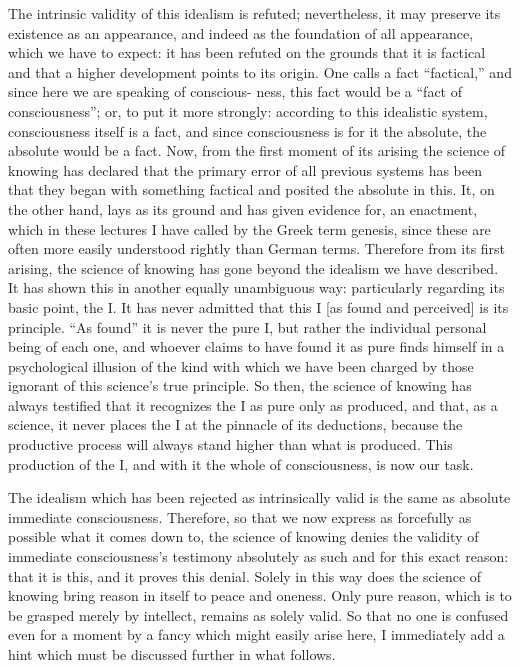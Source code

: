 The intrinsic validity of this idealism is refuted;
nevertheless, it may preserve its existence as an appearance,
and indeed as the foundation of all appearance,
which we have to expect:
it has been refuted on the grounds that it is factical
and that a higher development points to its origin.
One calls a fact
“factical,” and since here we are speaking of conscious-
ness, this fact would be a “fact of consciousness”;
or, to put it more strongly:
according to this idealistic system,
consciousness itself is a fact,
and since consciousness is for it the absolute,
the absolute would be a fact.
Now, from the first moment of its arising
the science of knowing has declared that the
primary error of all previous systems has been
that they began with something factical
and posited the absolute in this.
It, on the other hand, lays as its ground
and has given evidence for, an enactment,
which in these lectures I have called by the Greek term genesis,
since these are often more easily understood rightly than German terms.
Therefore from its first arising,
the science of knowing has gone beyond the idealism we have described.
It has shown this in another equally unambiguous way:
particularly regarding its basic point, the I.
It has never admitted that this I
[as found and perceived]
is its principle.
“As found” it is never the pure I,
but rather the individual personal being of each one,
and whoever claims to have found it as pure finds himself
in a psychological illusion of the kind
with which we have been charged by those
ignorant of this science's true principle.
So then, the science of knowing has always testified
that it recognizes the I as pure only as produced,
and that, as a science, it never places the I
at the pinnacle of its deductions,
because the productive process will always stand
higher than what is produced.
This production of the I,
and with it the whole of consciousness,
is now our task.

The idealism which has been rejected as intrinsically valid is
the same as absolute immediate consciousness.
Therefore, so that we now express
as forcefully as possible what it comes down to,
the science of knowing denies the validity of
immediate consciousness's testimony absolutely
as such and for this exact reason:
that it is this, and it proves this denial.
Solely in this way does the science of knowing
bring reason in itself to peace and oneness.
Only pure reason, which is to be grasped merely by intellect,
remains as solely valid.
So that no one is confused even for a moment
by a fancy which might easily arise here,
I immediately add a hint which must be discussed
further in what follows.

